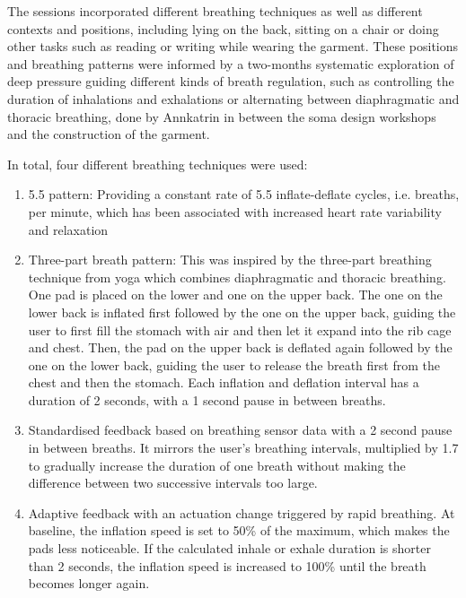 
The sessions incorporated different breathing techniques as well as different contexts and positions, including lying on the back, sitting on a chair or doing other tasks such as reading or writing while wearing the garment. These positions and breathing patterns were informed by a two-months systematic exploration of deep pressure guiding different kinds of breath regulation, such as controlling the duration of inhalations and exhalations or alternating between diaphragmatic and thoracic breathing, done by Annkatrin in between the soma design workshops and the construction of the garment.

In total, four different breathing techniques were used:
\begin{enumerate}
    \item 5.5 pattern: Providing a constant rate of 5.5 inflate-deflate cycles, i.e. breaths, per minute, which has been associated with increased heart rate variability and relaxation \cite{lin_breathing_2014}
    \item Three-part breath pattern: This was inspired by the three-part breathing technique from yoga \cite{sengupta_health_2012} which combines diaphragmatic and thoracic breathing. One pad is placed on the lower and one on the upper back. The one on the lower back is inflated first followed by the one on the upper back, guiding the user to first fill the stomach with air and then let it expand into the rib cage and chest. Then, the pad on the upper back is deflated again followed by the one on the lower back, guiding the user to release the breath first from the chest and then the stomach. Each inflation and deflation interval has a duration of 2 seconds, with a 1 second pause in between breaths.
    \item Standardised feedback based on breathing sensor data with a 2 second pause in between breaths. It mirrors the user’s breathing intervals, multiplied by 1.7 to gradually increase the duration of one breath without making the difference between two successive intervals too large.
    \item Adaptive feedback with an actuation change triggered by rapid breathing. At baseline, the inflation speed is set to 50\% of the maximum, which makes the pads less noticeable. If the calculated inhale or exhale duration is shorter than 2 seconds, the inflation speed is increased to 100\% until the breath becomes longer again.
\end{enumerate}

